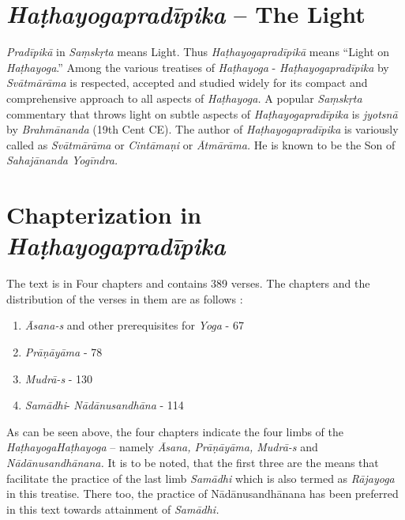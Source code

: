\section*{\textit{Haṭhayogapradīpika} – The Light }
\textit{Pradīpikā} in \textit{Saṃskṛta} means Light. Thus \textit{Haṭhayogapradīpikā} means “Light on \textit{Haṭhayoga}.” Among the various treatises of \textit{Haṭhayoga} - \textit{Haṭhayogapradīpika} by \textit{Svātmārāma} is respected, accepted and studied widely for its compact and comprehensive approach to all aspects of \textit{Haṭhayoga.} A popular \textit{Saṃskṛta} commentary that throws light on subtle aspects of \textit{Haṭhayogapradīpika} is  \textit{jyotsnā} by \textit{Brahmānanda} (19th Cent CE).  The author of \textit{Haṭhayogapradīpika} is variously called as \textit{Svātmārāma} or \textit{Cintāmaṇi} or \textit{Ātmārāma.} He is known to be the Son of \textit{Sahajānanda Yogīndra.}

\section*{Chapterization in \textit{Haṭhayogapradīpika}}

The text is in Four chapters and contains 389 verses. The chapters and the distribution of the verses in them are as follows :  

\begin{enumerate}
\itemsep=0pt
\renewcommand{\theenumi}{\Roman{enumi}}
\renewcommand{\labelenumi}{\theenumi.}
\item \textit{Āsana-s} and other prerequisites for \textit{Yoga} - 67
\item \textit{Prāṇāyāma} - 78
\item \textit{Mudrā-s}  - 130
\item \textit{Samādhi}- \textit{Nādānusandhāna} - 114
\end{enumerate}

As can be seen above, the four chapters indicate the four limbs of the \textit{HaṭhayogaHaṭhayoga} – namely \textit{Āsana, Prāṇāyāma, Mudrā-s} and \textit{Nādānusandhānana.} It is to be noted, that the first three are the means that facilitate the practice of the last limb \textit{Samādhi} which is also termed as \textit{Rājayoga} in this treatise. There too, the practice of Nādānusandhānana has been preferred in this text towards attainment of \textit{Samādhi.} 
